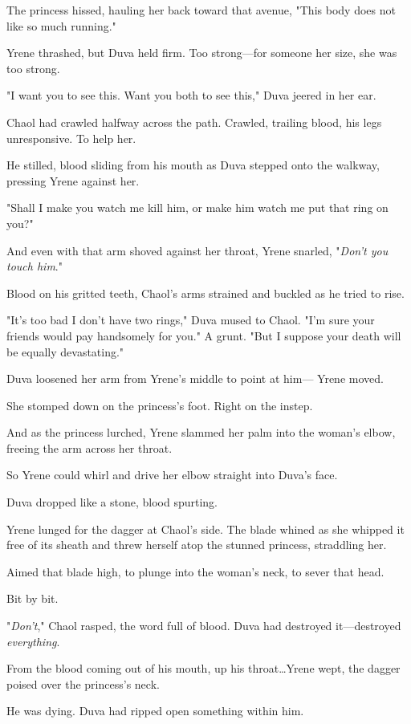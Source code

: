 The princess hissed, hauling her back toward that avenue, "This body does not like so much running."

Yrene thrashed, but Duva held firm.
Too strong---for someone her size, she was too strong.

"I want you to see this.
Want you both to see this," Duva jeered in her ear.

Chaol had crawled halfway across the path.
Crawled, trailing blood, his legs unresponsive.
To help her.

He stilled, blood sliding from his mouth as Duva stepped onto the walkway, pressing Yrene against her.

"Shall I make you watch me kill him, or make him watch me put that ring on you?"

And even with that arm shoved against her throat, Yrene snarled, "\emph{Don't you touch him}."

Blood on his gritted teeth, Chaol's arms strained and buckled as he tried to rise.

"It's too bad I don't have two rings," Duva mused to Chaol.
"I'm sure your friends would pay handsomely for you."
A grunt.
"But I suppose your death will be equally devastating."

Duva loosened her arm from Yrene's middle to point at him--- Yrene moved.

She stomped down on the princess's foot.
Right on the instep.

And as the princess lurched, Yrene slammed her palm into the woman's elbow, freeing the arm across her throat.

So Yrene could whirl and drive her elbow straight into Duva's face.

Duva dropped like a stone, blood spurting.

Yrene lunged for the dagger at Chaol's side.
The blade whined as she whipped it free of its sheath and threw herself atop the stunned princess, straddling her.

Aimed that blade high, to plunge into the woman's neck, to sever that head.

Bit by bit.

"\emph{Don't}," Chaol rasped, the word full of blood.
Duva had destroyed it---destroyed \emph{everything}.

From the blood coming out of his mouth, up his throat\ldots Yrene wept, the dagger poised over the princess's neck.

He was dying.
Duva had ripped open something within him.

